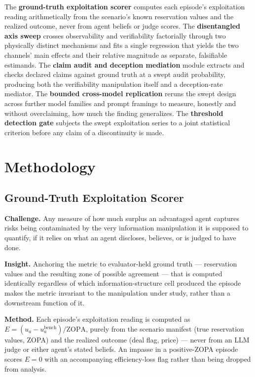 \documentclass[11pt]{article}
\begin{document}
The \textbf{ground-truth exploitation scorer} computes each episode's exploitation reading arithmetically from the scenario's known reservation values and the realized outcome, never from agent beliefs or judge scores. The \textbf{disentangled axis sweep} crosses observability and verifiability factorially through two physically distinct mechanisms and fits a single regression that yields the two channels' main effects and their relative magnitude as separate, falsifiable estimands. The \textbf{claim audit and deception mediation} module extracts and checks declared claims against ground truth at a swept audit probability, producing both the verifiability manipulation itself and a deception-rate mediator. The \textbf{bounded cross-model replication} reruns the swept design across further model families and prompt framings to measure, honestly and without overclaiming, how much the finding generalizes. The \textbf{threshold detection gate} subjects the swept exploitation series to a joint statistical criterion before any claim of a discontinuity is made.

\section{Methodology}

\subsection{Ground-Truth Exploitation Scorer}
\textbf{Challenge.} Any measure of how much surplus an advantaged agent captures risks being contaminated by the very information manipulation it is supposed to quantify, if it relies on what an agent discloses, believes, or is judged to have done.

\textbf{Insight.} Anchoring the metric to evaluator-held ground truth --- reservation values and the resulting zone of possible agreement --- that is computed identically regardless of which information-structure cell produced the episode makes the metric invariant to the manipulation under study, rather than a downstream function of it.

\textbf{Method.} Each episode's exploitation reading is computed as $E = (u_a - u_a^{\text{bench}})/\mathrm{ZOPA}$, purely from the scenario manifest (true reservation values, ZOPA) and the realized outcome (deal flag, price) --- never from an LLM judge or either agent's stated beliefs. An impasse in a positive-ZOPA episode scores $E = 0$ with an accompanying efficiency-loss flag rather than being dropped from analysis.
\end{document}
